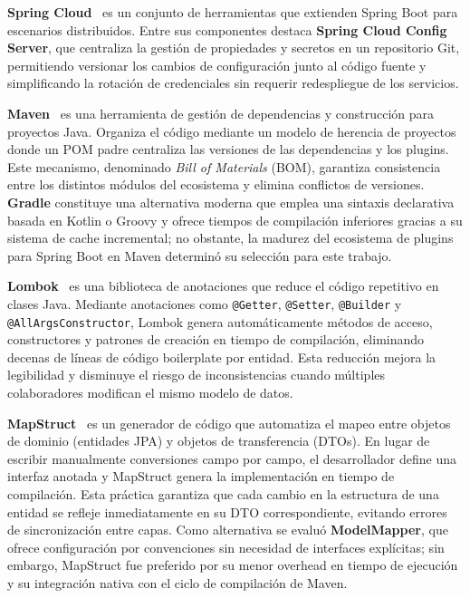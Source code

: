 \textbf{Spring Cloud}~\cite{springcloud2024} es un conjunto de herramientas que extienden Spring Boot para escenarios distribuidos. Entre sus componentes destaca \textbf{Spring Cloud Config Server}, que centraliza la gesti\'{o}n de propiedades y secretos en un repositorio Git, permitiendo versionar los cambios de configuraci\'{o}n junto al c\'{o}digo fuente y simplificando la rotaci\'{o}n de credenciales sin requerir redespliegue de los servicios.

\textbf{Maven}~\cite{maven2024} es una herramienta de gesti\'{o}n de dependencias y construcci\'{o}n para proyectos Java. Organiza el c\'{o}digo mediante un modelo de herencia de proyectos donde un POM padre centraliza las versiones de las dependencias y los plugins. Este mecanismo, denominado \textit{Bill of Materials} (BOM), garantiza consistencia entre los distintos m\'{o}dulos del ecosistema y elimina conflictos de versiones. \textbf{Gradle} constituye una alternativa moderna que emplea una sintaxis declarativa basada en Kotlin o Groovy y ofrece tiempos de compilaci\'{o}n inferiores gracias a su sistema de cache incremental; no obstante, la madurez del ecosistema de plugins para Spring Boot en Maven determin\'{o} su selecci\'{o}n para este trabajo.

\textbf{Lombok}~\cite{lombok2024} es una biblioteca de anotaciones que reduce el c\'{o}digo repetitivo en clases Java. Mediante anotaciones como \texttt{@Getter}, \texttt{@Setter}, \texttt{@Builder} y \texttt{@AllArgsConstructor}, Lombok genera autom\'{a}ticamente m\'{e}todos de acceso, constructores y patrones de creaci\'{o}n en tiempo de compilaci\'{o}n, eliminando decenas de l\'{i}neas de c\'{o}digo boilerplate por entidad. Esta reducci\'{o}n mejora la legibilidad y disminuye el riesgo de inconsistencias cuando m\'{u}ltiples colaboradores modifican el mismo modelo de datos.

\textbf{MapStruct}~\cite{mapstruct2024} es un generador de c\'{o}digo que automatiza el mapeo entre objetos de dominio (entidades JPA) y objetos de transferencia (DTOs). En lugar de escribir manualmente conversiones campo por campo, el desarrollador define una interfaz anotada y MapStruct genera la implementaci\'{o}n en tiempo de compilaci\'{o}n. Esta pr\'{a}ctica garantiza que cada cambio en la estructura de una entidad se refleje inmediatamente en su DTO correspondiente, evitando errores de sincronizaci\'{o}n entre capas. Como alternativa se evalu\'{o} \textbf{ModelMapper}, que ofrece configuraci\'{o}n por convenciones sin necesidad de interfaces expl\'{i}citas; sin embargo, MapStruct fue preferido por su menor overhead en tiempo de ejecuci\'{o}n y su integraci\'{o}n nativa con el ciclo de compilaci\'{o}n de Maven.

